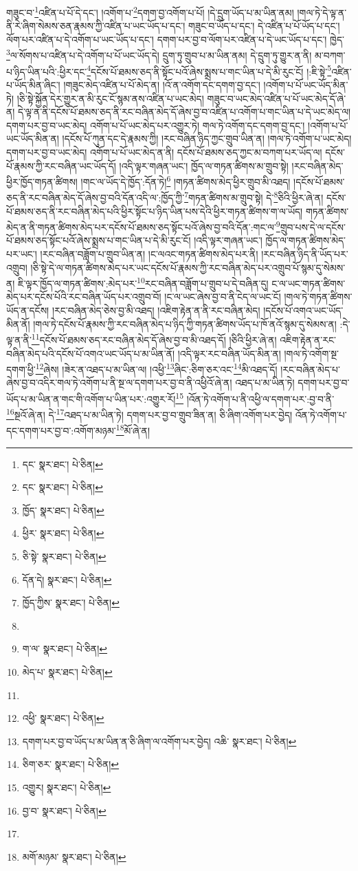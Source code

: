 གཟུང་བ་\footnote{དང་  སྣར་ཐང་།  པེ་ཅིན། }འཛིན་པ་པོ་དེ་དང་། །འགོག་པ་\footnote{དང་  སྣར་ཐང་།  པེ་ཅིན། }དགག་བྱ་འགོག་པ་པོ། །དེ་དྲུག་ཡོད་པ་མ་ཡིན་ནམ། །གལ་ཏེ་དེ་ལྟ་ན་ནི་རེ་ཞིག་སེམས་ཅན་རྣམས་ཀྱི་འཛིན་པ་ཡང་ཡོད་པ་དང་། གཟུང་བ་ཡོད་པ་དང་། དེ་འཛིན་པ་པོ་ཡོད་པ་དང་། ལོག་པར་འཛིན་པ་དེ་འགོག་པ་ཡང་ཡོད་པ་དང་། དགག་པར་བྱ་བ་ལོག་པར་འཛིན་པ་དེ་ཡང་ཡོད་པ་དང་། ཁྱེད་\footnote{ཁྱོད་  སྣར་ཐང་།  པེ་ཅིན། }ལ་སོགས་པ་འཛིན་པ་དེ་འགོག་པ་པོ་ཡང་ཡོད་དེ། དྲུག་ཏུ་གྲུབ་པ་མ་ཡིན་ནམ། དེ་དྲུག་ཏུ་གྱུར་ན་ནི། མ་བཀག་པ་ཉིད་ཡིན་པའི་:ཕྱིར་དང་\footnote{ཕྱིར་  སྣར་ཐང་།  པེ་ཅིན། }དངོས་པོ་ཐམས་ཅད་ནི་སྟོང་པའོ་ཞེས་སྨྲས་པ་གང་ཡིན་པ་དེ་མི་རུང་ངོ། །:ཇི་སྟེ་\footnote{ཅི་སྟེ་  སྣར་ཐང་།  པེ་ཅིན། }འཛིན་པ་ཡོད་མིན་ཞིང་། །གཟུང་མེད་འཛིན་པ་པོ་མེད་ན། །འོ་ན་འགོག་དང་དགག་བྱ་དང་། །འགོག་པ་པོ་ཡང་ཡོད་མིན་ཏེ། །ཅི་སྟེ་སྐྱོན་དེར་གྱུར་ན་མི་རུང་ངོ་སྙམ་ནས་འཛིན་པ་ཡང་མེད། གཟུང་བ་ཡང་མེད་འཛིན་པ་པོ་ཡང་མེད་དོ་ཞེ་ན། དེ་ལྟ་ན་ནི་དངོས་པོ་ཐམས་ཅད་ནི་རང་བཞིན་མེད་དོ་ཞེས་བྱ་བ་འཛིན་པ་འགོག་པ་གང་ཡིན་པ་དེ་ཡང་མེད་ལ། དགག་པར་བྱ་བ་ཡང་མེད། འགོག་པ་པོ་ཡང་མེད་པར་འགྱུར་ཏེ། གལ་ཏེ་འགོག་དང་དགག་བྱ་དང་། །འགོག་པ་པོ་ཡང་ཡོད་མིན་ན། །དངོས་པོ་ཀུན་དང་དེ་རྣམས་ཀྱི། །རང་བཞིན་ཉིད་ཀྱང་གྲུབ་ཡིན་ན། །གལ་ཏེ་འགོག་པ་ཡང་མེད། དགག་པར་བྱ་བ་ཡང་མེད། འགོག་པ་པོ་ཡང་མེད་ན་ནི། དངོས་པོ་ཐམས་ཅད་ཀྱང་མ་བཀག་པར་ཡོད་ལ། དངོས་པོ་རྣམས་ཀྱི་རང་བཞིན་ཡང་ཡོད་དོ། །འདི་ལྟར་གཞན་ཡང་། ཁྱོད་ལ་གཏན་ཚིགས་མ་གྲུབ་སྟེ། །རང་བཞིན་མེད་ཕྱིར་ཁྱོད་གཏན་ཚིགས། །གང་ལ་ཡོད་དེ་ཁྱོད་:དོན་ཏེ།\footnote{དོན་དེ།  སྣར་ཐང་།  པེ་ཅིན། } །གཏན་ཚིགས་མེད་ཕྱིར་གྲུབ་མི་འཐད། །དངོས་པོ་ཐམས་ཅད་ནི་རང་བཞིན་མེད་དོ་ཞེས་བྱ་བའི་དོན་འདི་ལ་:ཁྱོད་ཀྱི་\footnote{ཁྱོད་ཀྱིས་  སྣར་ཐང་།  པེ་ཅིན། }གཏན་ཚིགས་མ་གྲུབ་སྟེ། དེ་\footnote{}ཅིའི་ཕྱིར་ཞེ་ན། དངོས་པོ་ཐམས་ཅད་ནི་རང་བཞིན་མེད་པའི་ཕྱིར་སྟོང་པ་ཉིད་ཡིན་པས་དེའི་ཕྱིར་གཏན་ཚིགས་ག་ལ་ཡོད། གཏན་ཚིགས་མེད་ན་ནི་གཏན་ཚིགས་མེད་པར་དངོས་པོ་ཐམས་ཅད་སྟོང་པའོ་ཞེས་བྱ་བའི་དོན་:གང་ལ་\footnote{ག་ལ་  སྣར་ཐང་།  པེ་ཅིན། }གྲུབ་པས་དེ་ལ་དངོས་པོ་ཐམས་ཅད་སྟོང་པའོ་ཞེས་སྨྲས་པ་གང་ཡིན་པ་དེ་མི་རུང་ངོ། །འདི་ལྟར་གཞན་ཡང་། ཁྱོད་ལ་གཏན་ཚིགས་མེད་པར་ཡང་། །རང་བཞིན་བཟློག་པ་གྲུབ་ཡིན་ན། །ང་ལའང་གཏན་ཚིགས་མེད་པར་ནི། །རང་བཞིན་ཉིད་ནི་ཡོད་པར་འགྲུབ། །ཅི་སྟེ་དེ་ལ་གཏན་ཚིགས་མེད་པར་ཡང་དངོས་པོ་རྣམས་ཀྱི་རང་བཞིན་མེད་པར་འགྲུབ་པོ་སྙམ་དུ་སེམས་ན། ཇི་ལྟར་ཁྱོད་ལ་གཏན་ཚིགས་:མེད་པར་\footnote{མེད་པ་  སྣར་ཐང་།  པེ་ཅིན། }རང་བཞིན་བཟློག་པ་གྲུབ་པ་དེ་བཞིན་དུ། ང་ལ་ཡང་གཏན་ཚིགས་མེད་པར་དངོས་པོའི་རང་བཞིན་ཡོད་པར་འགྲུབ་བོ། །ང་ལ་ཡང་ཞེས་བྱ་བ་ནི་ངེད་ལ་ཡང་ངོ། །གལ་ཏེ་གཏན་ཚིགས་ཡོད་ན་དངོས། །རང་བཞིན་མེད་ཅེས་བྱ་མི་འཐད། །འཇིག་རྟེན་ན་ནི་རང་བཞིན་མེད། །དངོས་པོ་འགའ་ཡང་ཡོད་མིན་ནོ། །གལ་ཏེ་དངོས་པོ་རྣམས་ཀྱི་རང་བཞིན་མེད་པ་ཉིད་ཀྱི་གཏན་ཚིགས་ཡོད་པ་ཁོ་ནའོ་སྙམ་དུ་སེམས་ན། :དེ་ལྟ་ན་ནི་\footnote{}དངོས་པོ་ཐམས་ཅད་རང་བཞིན་མེད་དོ་ཞེས་བྱ་བ་མི་འཐད་དོ། །ཅིའི་ཕྱིར་ཞེ་ན། འཇིག་རྟེན་ན་རང་བཞིན་མེད་པའི་དངོས་པོ་འགའ་ཡང་ཡོད་པ་མ་ཡིན་ནོ། །འདི་ལྟར་རང་བཞིན་ཡོད་མིན་ན། །གལ་ཏེ་འགོག་སྔ་དགག་ཕྱི་\footnote{འཕྱི་  སྣར་ཐང་།  པེ་ཅིན། }ཞེས། །ཟེར་ན་འཐད་པ་མ་ཡིན་ལ། །འཕྱི་\footnote{དགག་པར་བྱ་བ་ཡོད་པ་མ་ཡིན་ན་ཅི་ཞིག་ལ་འགོག་པར་བྱེད། འཆི་  སྣར་ཐང་།  པེ་ཅིན། }ཞིང་:ཅིག་ཅར་འང་\footnote{ཅིག་ཅར་  སྣར་ཐང་།  པེ་ཅིན། }མི་འཐད་དོ། །རང་བཞིན་མེད་པ་ཞེས་བྱ་བ་འདིར་གལ་ཏེ་འགོག་པ་ནི་སྔ་ལ་དགག་པར་བྱ་བ་ནི་འཕྱིའོ་ཞེ་ན། འཐད་པ་མ་ཡིན་ཏེ། དགག་པར་བྱ་བ་ཡོད་པ་མ་ཡིན་ན་གང་གི་འགོག་པ་ཡིན་པར་:འགྱུར་རོ།\footnote{འགྱུར།  སྣར་ཐང་།  པེ་ཅིན། } །འོན་ཏེ་འགོག་པ་ནི་འཕྱི་ལ་དགག་པར་:བྱ་བ་ནི་\footnote{བྱ་བ་  སྣར་ཐང་།  པེ་ཅིན། }སྔའོ་ཞེ་ན། དེ་\footnote{}འཐད་པ་མ་ཡིན་ཏེ། དགག་པར་བྱ་བ་གྲུབ་ཟིན་ན། ཅི་ཞིག་འགོག་པར་བྱེད། འོན་ཏེ་འགོག་པ་དང་དགག་པར་བྱ་བ་:འགོག་མཉམ་\footnote{མགོ་མཉམ་  སྣར་ཐང་།  པེ་ཅིན། }མོ་ཞེ་ན། 